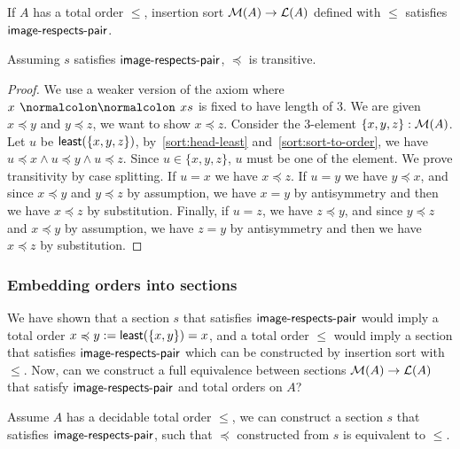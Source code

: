 \begin{proposition}
    If $A$ has a total order $\leq$, insertion sort $\mathcal{M}(A) \to \mathcal{L}(A)$ defined with $\leq$
    satisfies $\operatorname{\mathsf{image-respects-pair}}$.
\end{proposition}

\begin{proposition}\label{sort:trans}
    Assuming $s$ satisfies $\operatorname{\mathsf{image-respects-pair}}$, $\preccurlyeq$ is transitive.
\end{proposition}
\begin{proof}
    We use a weaker version of the axiom where $x \cons xs$ is fixed to have length of 3.
    We are given $x \preccurlyeq y$ and $y \preccurlyeq z$, we want to show $x \preccurlyeq z$.
    Consider the 3-element $\{x,y,z\} : \mathcal{M}(A)$. Let $u$ be $\operatorname{\mathsf{least}}(\{x,y,z\})$,
    by~\cref{sort:head-least} and~\cref{sort:sort-to-order},
    we have $u \preccurlyeq x \land u \preccurlyeq y \land u \preccurlyeq z$.
    Since $u \in \{x,y,z\}$, $u$ must be one of the element. We prove transitivity by case splitting.
    If $u = x$ we have $x \preccurlyeq z$. If $u = y$ we have $y \preccurlyeq x$, and since
    $x \preccurlyeq y$ and $y \preccurlyeq z$ by assumption,
    we have $x = y$ by antisymmetry and then we have $x \preccurlyeq z$ by substitution.
    Finally, if $u = z$, we have $z \preccurlyeq y$, and since
    $y \preccurlyeq z$ and $x \preccurlyeq y$ by assumption,
    we have $z = y$ by antisymmetry and then we have $x \preccurlyeq z$ by substitution.
\end{proof}

\subsubsection{Embedding orders into sections}

We have shown that a section $s$ that satisfies $\operatorname{\mathsf{image-respects-pair}}$ would imply a total order
$x \preccurlyeq y := \operatorname{\mathsf{least}}(\{x, y\}) = x$,
and a total order $\leq$ would imply a section that satisfies $\operatorname{\mathsf{image-respects-pair}}$ which can
be constructed by insertion sort with $\leq$. Now, can we construct a full equivalence
between sections $\mathcal{M}(A) \to \mathcal{L}(A)$ that satisfy $\operatorname{\mathsf{image-respects-pair}}$ and total orders on $A$?

\begin{proposition}\label{sort:o2s2o}
    Assume $A$ has a decidable total order $\leq$, we can construct a section $s$ that
    satisfies $\operatorname{\mathsf{image-respects-pair}}$, such that $\preccurlyeq$ constructed from $s$ is equivalent
    to $\leq$.
\end{proposition}

